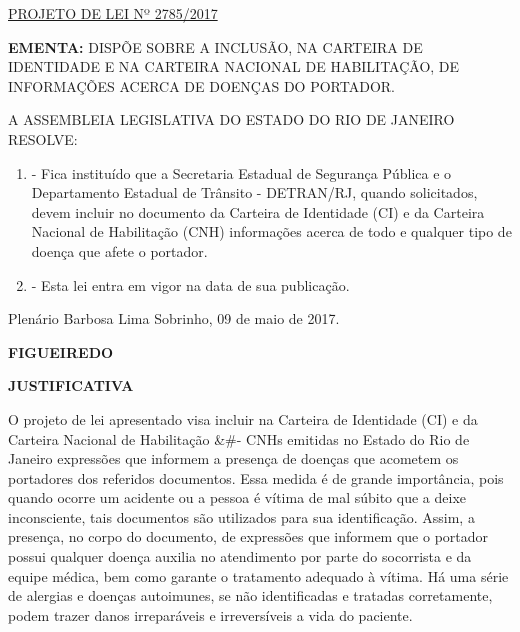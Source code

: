 \documentclass[10pt]{article}
\date{}
\begin{document}
\maketitle
\begin{center}
  \huge
  \vspace{-3cm}\href{http://alerjln1.alerj.rj.gov.br/scpro1519.nsf/f4b46b3cdbba990083256cc900746cf6/1b9d326a3d6c00f18325811b0061aa4c?OpenDocument}{PROJETO DE LEI Nº 2785/2017}
\bigskip
\bigskip
\bigskip
  
\end{center}

\textbf{EMENTA:} 
DISPÕE SOBRE A INCLUSÃO, NA CARTEIRA DE IDENTIDADE E NA CARTEIRA NACIONAL DE HABILITAÇÃO, DE INFORMAÇÕES ACERCA DE DOENÇAS DO PORTADOR.








\bigskip

\noindent
A ASSEMBLEIA LEGISLATIVA DO ESTADO DO RIO DE JANEIRO RESOLVE:

\begin{enumerate}[label=Art. \arabic*\textdegree]

\item - Fica instituído que a Secretaria Estadual de Segurança Pública e o Departamento Estadual de Trânsito - DETRAN/RJ, quando solicitados, devem incluir no documento da Carteira de Identidade (CI) e da Carteira Nacional de Habilitação (CNH) informações acerca de todo e qualquer tipo de doença que afete o portador.

\item - Esta lei entra em vigor na data de sua publicação.
	

\end{enumerate}




\begin{center}
  Plenário Barbosa Lima Sobrinho, 09 de maio de 2017.

   \bigskip

  \textbf{ FIGUEIREDO}

  \bigskip

  \textbf{JUSTIFICATIVA}
  \bigskip

\end{center}

  O projeto de lei apresentado visa incluir na Carteira de Identidade (CI) e da Carteira Nacional de Habilitação &#- CNHs emitidas no Estado do Rio de Janeiro expressões que informem a presença de doenças que acometem os portadores dos referidos documentos.
Essa medida é de grande importância, pois quando ocorre um acidente ou a pessoa é vítima de mal súbito que a deixe inconsciente, tais documentos são utilizados para sua identificação. Assim, a presença, no corpo do documento, de expressões que informem que o portador possui qualquer doença auxilia no atendimento por parte do socorrista e da equipe médica, bem como garante o tratamento adequado à vítima.
Há uma série de alergias e doenças autoimunes, se não identificadas e tratadas corretamente, podem trazer danos irreparáveis e irreversíveis a vida do paciente.



\iffalse
\begin{center}
  \textbf{REFERÊNCIAS}
\end{center}


\fi
\end{document}
